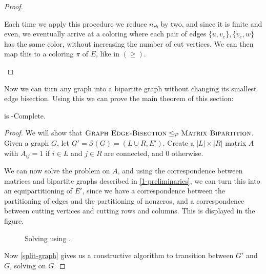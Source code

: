 \begin{proof}
\begin{enumerate}
					Each time we apply this procedure we reduce $n_{rb}$ by
					two, and since it is finite and even, we eventually arrive
					at a coloring where each pair of edges $\{u, v_e\},
					\{v_e, w\}$ has the same color, without increasing the
					number of cut vertices. We can then map this to
					a coloring $\pi$ of $E$, like in $(\geq)$.
		\end{enumerate}
	\end{proof}

	Now we can turn any graph into a bipartite graph without changing its
	smallest edge bisection. Using this we can prove the main theorem of this
	section:

	\begin{theorem}
		\label{main-thm}
		\mbpt is \NP-Complete.
	\end{theorem}
	\begin{proof}
		We will show that $\textsc{Graph \allowbreak Edge-\allowbreak Bisection} \leq_{\mathcal{P}} \textsc{Matrix \allowbreak Bipartition}$. Given a graph $G$,
		let $G'=\mathcal{S}(G)=(L\cup R, E')$. Create a $|L| \times |R|$ matrix
		$A$ with $A_{ij} = 1$ if $i \in L$ and $j \in R$ are connected, and $0$
		otherwise.

		We can now solve the \mbpt problem on $A$, and using the correspondence
		between matrices and bipartite graphs described in
		\autoref{1-preliminaries}, we can turn this into an equipartitioning of
		$E'$, since we have a correspondence between the partitioning of edges
		and the partitioning of nonzeros, and a correspondence between cutting
		vertices and cutting rows and columns. This is displayed in the figure.

		\begin{figure}[h]
			
			\centering
			\label{figmgeb}
			\caption{Solving \geb using \mbpt.}
		\end{figure}

		Now \autoref{split-graph} gives us a constructive algorithm to
		transition between $G'$ and $G$, solving \geb on $G$.
	\end{proof}

